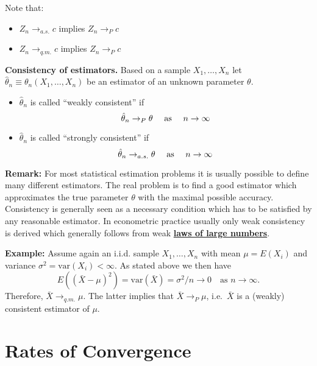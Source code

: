 \documentclass[
]{book}
\providecommand{\tightlist}{%
  \setlength{\itemsep}{0pt}\setlength{\parskip}{0pt}}
\begin{document}
Note that:

\begin{itemize}
\tightlist
\item
  \(Z_n\to_{a.s.} c\) implies \(Z_n\to_P c\)
\item
  \(Z_n\to_{q.m.} c\) implies \(Z_n\to_P c\)
\end{itemize}

\hfill\break

\textbf{Consistency of estimators.} Based on a sample \(X_1,\dots,X_n\) let \(\hat\theta_n\equiv\theta_n(X_1,\dots,X_n)\) be an estimator of an unknown parameter \(\theta\).

\begin{itemize}
\tightlist
\item
  \(\hat\theta_n\) is called ``weakly consistent'' if
  \[\hat{\theta}_n\to_{P} \theta\quad \hbox{ as }\quad n\to\infty \]
\item
  \(\hat\theta_n\) is called ``strongly consistent'' if
  \[\hat{\theta}_n\to_{a.s.} \theta\quad \hbox{ as }\quad n\to\infty \]
\end{itemize}

\hfill\break

\textbf{Remark:} For most statistical estimation problems it is usually possible to define many different estimators. The real problem is to find a good estimator which approximates the true parameter \(\theta\) with the maximal possible accuracy. Consistency is generally seen as a necessary condition which has to be satisfied by any reasonable estimator. In econometric practice usually only weak consistency is derived which generally follows from weak \href{https://www.statlect.com/asymptotic-theory/law-of-large-numbers}{\textbf{laws of large numbers}}.

\hfill\break

\textbf{Example:} Assume again an i.i.d. sample \(X_1,\dots,X_n\) with mean \(\mu=E(X_i)\) and variance \(\sigma^2=\textrm{var}(X_i)<\infty\). As stated above we then have
\[E\left((\bar X-\mu)^2\right)=\textrm{var}(\bar X)=\sigma^2/n\rightarrow 0 \quad \text{as } n\rightarrow\infty.\]
Therefore, \(\bar X \to_{q.m.} \mu\). The latter implies that \(\bar X \to_{P} \mu\), i.e.~\(\bar X\) is a (weakly) consistent estimator of \(\mu\).

\hypertarget{rates-of-convergence}{%
\section{Rates of Convergence}\label{rates-of-convergence}}
\end{document}
